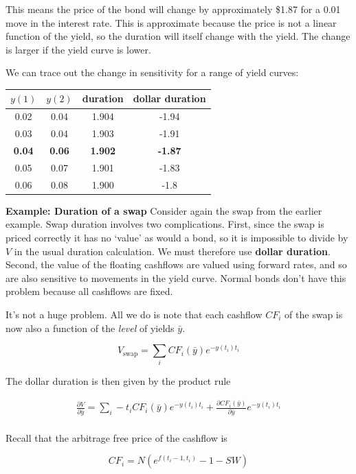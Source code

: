 This means the price of the bond will change by approximately  \$1.87  for a 0.01 move in the interest rate. This is approximate because the price is not a linear function of the yield, so the duration will itself change with the yield. The change is larger if the yield curve is lower.

We can trace out the change in sensitivity for a range of yield curves:

\begin{center}
\begin{tabular}{|c|c|c|c|}
\hline
$y(1)$ & $y(2)$ & duration & dollar duration\\
\hline
0.02& 0.04 & 1.904 &-1.94\\
0.03 & 0.04 &1.903 &-1.91\\
\textbf{0.04} & \textbf{0.06} & \textbf{1.902} & \textbf{-1.87} \\
0.05 & 0.07 & 1.901&-1.83\\
0.06 & 0.08 & 1.900 &-1.8\\
\hline
\end{tabular}
\end{center}

\textbf{Example: Duration of a swap}
Consider again the swap from the earlier example. Swap duration involves two complications. First, since the swap is priced correctly it has no `value' as would a bond, so it is impossible to divide by $V$ in the usual duration calculation. We must therefore use \textbf{dollar duration}. Second, the value of the floating cashflows are valued using forward rates, and so are also sensitive to movements in the yield curve. Normal bonds don't have this problem because all cashflows are fixed.

It's not a huge problem. All we do is note that each cashflow $CF_i$ of the swap is now also a function of the \textit{level} of yields $\bar{y}$. 

\[V_{\textrm{swap}} = \sum_i CF_i(\bar{y}) e^{-y(t_i)t_i} \]

The dollar duration is then given by the product rule

\begin{eqnarray*}
\frac{\partial V}{\partial \bar{y}}  =  \sum_i -t_i CF_i(\bar{y}) e^{-y(t_i)t_i} + \frac{\partial CF_i(\bar{y})}{\partial \bar{y}} e^{-y(t_i)t_i} \\
\end{eqnarray*}

Recall that the arbitrage free price of the cashflow is 

\[CF_i = N(e^{f(t_i-1,t_i)}-1-SW)  \]

